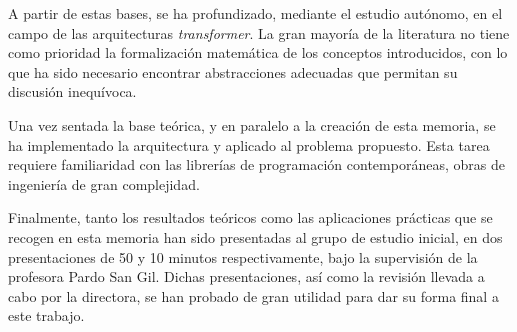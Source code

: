 A partir de estas bases, se ha profundizado, mediante el estudio autónomo, en el campo de las arquitecturas \textit{transformer}. La gran mayoría de la literatura no tiene como prioridad la formalización matemática de los conceptos introducidos, con lo que ha sido necesario encontrar abstracciones adecuadas que permitan su discusión inequívoca.

Una vez sentada la base teórica, y en paralelo a la creación de esta memoria, se ha implementado la arquitectura y aplicado al problema propuesto. Esta tarea requiere familiaridad con las librerías de programación contemporáneas, obras de ingeniería de gran complejidad.

Finalmente, tanto los resultados teóricos como las aplicaciones prácticas que se recogen en esta memoria han sido presentadas al grupo de estudio inicial, en dos presentaciones de 50 y 10 minutos respectivamente, bajo la supervisión de la profesora Pardo San Gil. Dichas presentaciones, así como la revisión llevada a cabo por la directora, se han probado de gran utilidad para dar su forma final a este trabajo.



